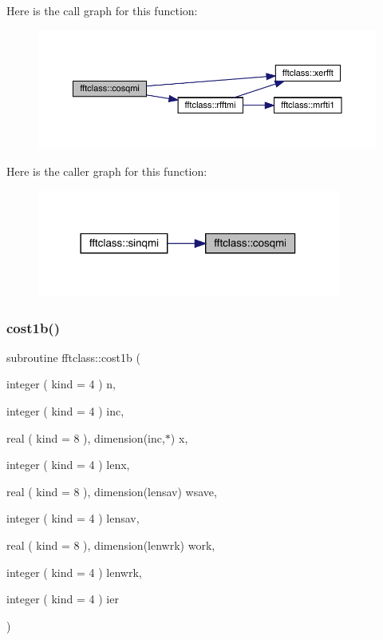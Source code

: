 Here is the call graph for this function\+:\nopagebreak
\begin{figure}[H]
\begin{center}
\leavevmode
\includegraphics[width=350pt]{namespacefftclass_a9851ac46e48072ac6c85e3c574a10dc5_cgraph}
\end{center}
\end{figure}
Here is the caller graph for this function\+:\nopagebreak
\begin{figure}[H]
\begin{center}
\leavevmode
\includegraphics[width=282pt]{namespacefftclass_a9851ac46e48072ac6c85e3c574a10dc5_icgraph}
\end{center}
\end{figure}
\mbox{\label{namespacefftclass_a2bdaaab2b5d3130f8339f9463daa6db9}} 
\subsubsection{\texorpdfstring{cost1b()}{cost1b()}}
{\footnotesize\ttfamily subroutine fftclass\+::cost1b (\begin{DoxyParamCaption}\item[{integer ( kind = 4 )}]{n,  }\item[{integer ( kind = 4 )}]{inc,  }\item[{real ( kind = 8 ), dimension(inc,$\ast$)}]{x,  }\item[{integer ( kind = 4 )}]{lenx,  }\item[{real ( kind = 8 ), dimension(lensav)}]{wsave,  }\item[{integer ( kind = 4 )}]{lensav,  }\item[{real ( kind = 8 ), dimension(lenwrk)}]{work,  }\item[{integer ( kind = 4 )}]{lenwrk,  }\item[{integer ( kind = 4 )}]{ier }\end{DoxyParamCaption})}


